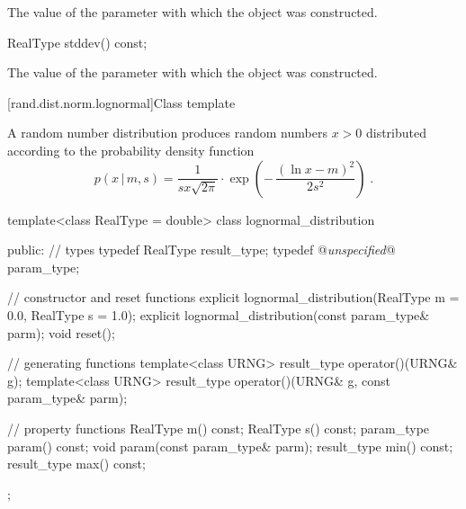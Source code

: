 \begin{itemdescr}
\pnum\returns The value of the  parameter
 with which the object was constructed.
\end{itemdescr}

%
%
\begin{itemdecl}
RealType stddev() const;
\end{itemdecl}

\begin{itemdescr}
\pnum\returns The value of the  parameter
 with which the object was constructed.
\end{itemdescr}


[rand.dist.norm.lognormal]{Class template }%
%

\pnum
A  random number distribution
produces random numbers $ x > 0 $
distributed according to
the probability density function%
%
\[%
 p(x\,|\,m,s)
      = \frac{1}
             {s x \sqrt{2 \pi}}
        \cdot
        \exp{\left(- \, \frac{(\ln{x} - m)^2}
                             {2 s^2}
             \right)
            }
\; \mbox{.}
\]

\begin{codeblock}
template<class RealType = double>
 class lognormal_distribution
{
public:
 // types
 typedef RealType result_type;
 typedef @\textit{unspecified}@ param_type;

 // constructor and reset functions
 explicit lognormal_distribution(RealType m = 0.0, RealType s = 1.0);
 explicit lognormal_distribution(const param_type& parm);
 void reset();

 // generating functions
 template<class URNG>
   result_type operator()(URNG& g);
 template<class URNG>
   result_type operator()(URNG& g, const param_type& parm);

 // property functions
 RealType m() const;
 RealType s() const;
 param_type param() const;
 void param(const param_type& parm);
 result_type min() const;
 result_type max() const;
};
\end{codeblock}


